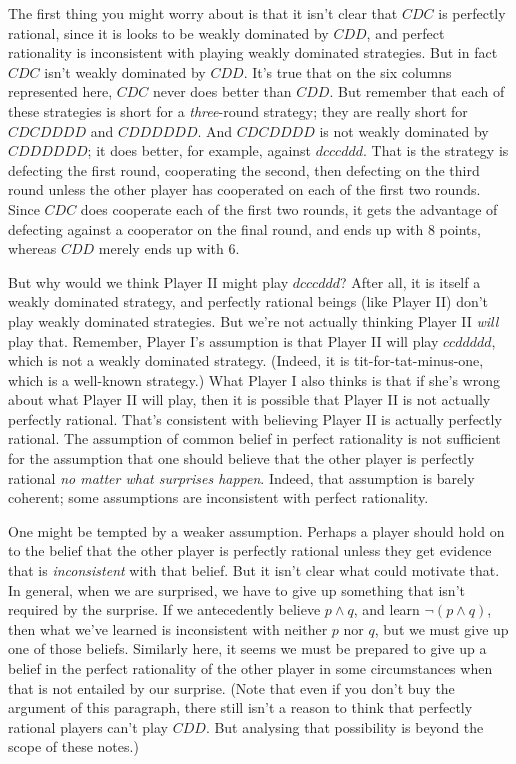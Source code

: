 \documentclass[openany]{book}
\begin{document}
The first thing you might worry about is that it isn't clear that $CDC$ is perfectly rational, since it is looks to be weakly dominated by $CDD$, and perfect rationality is inconsistent with playing weakly dominated strategies. But in fact $CDC$ isn't weakly dominated by $CDD$. It's true that on the six columns represented here, $CDC$ never does better than $CDD$. But remember that each of these strategies is short for a \textit{three}-round strategy; they are really short for $CDCDDDD$ and $CDDDDDD$. And $CDCDDDD$ is not weakly dominated by $CDDDDDD$; it does better, for example, against $dcccddd$. That is the strategy is defecting the first round, cooperating the second, then defecting on the third round unless the other player has cooperated on each of the first two rounds. Since $CDC$ does cooperate each of the first two rounds, it gets the advantage of defecting against a cooperator on the final round, and ends up with 8 points, whereas $CDD$ merely ends up with 6.

But why would we think Player II might play $dcccddd$? After all, it is itself a weakly dominated strategy, and perfectly rational beings (like Player II) don't play weakly dominated strategies. But we're not actually thinking Player II \textit{will} play that. Remember, Player I's assumption is that Player II will play $ccddddd$, which is not a weakly dominated strategy. (Indeed, it is tit-for-tat-minus-one, which is a well-known strategy.) What Player I also thinks is that if she's wrong about what Player II will play, then it is possible that Player II is not actually perfectly rational. That's consistent with believing Player II is actually perfectly rational. The assumption of common belief in perfect rationality is not sufficient for the assumption that one should believe that the other player is perfectly rational \textit{no matter what surprises happen}. Indeed, that assumption is barely coherent; some assumptions are inconsistent with perfect rationality.

One might be tempted by a weaker assumption. Perhaps a player should hold on to the belief that the other player is perfectly rational unless they get evidence that is \textit{inconsistent} with that belief. But it isn't clear what could motivate that. In general, when we are surprised, we have to give up something that isn't required by the surprise. If we antecedently believe $p \wedge q$, and learn $\neg (p \wedge q)$, then what we've learned is inconsistent with neither $p$ nor $q$, but we must give up one of those beliefs. Similarly here, it seems we must be prepared to give up a belief in the perfect rationality of the other player in some circumstances when that is not entailed by our surprise. (Note that even if you don't buy the argument of this paragraph, there still isn't a reason to think that perfectly rational players can't play $CDD$. But analysing that possibility is beyond the scope of these notes.)
\end{document}
